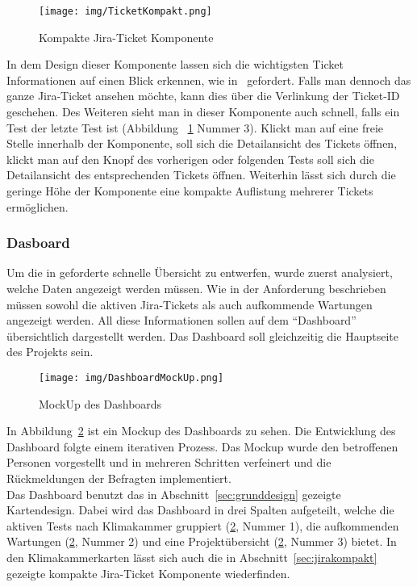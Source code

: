 \begin{figure}[H]
    \texttt{[image: img/TicketKompakt.png]}
    \caption{Kompakte Jira-Ticket Komponente}\label{fig:ticketcompact}
\end{figure}

In dem Design dieser Komponente lassen sich die wichtigsten Ticket Informationen
auf einen Blick erkennen, wie in~ gefordert. 
Falls man dennoch das ganze Jira-Ticket ansehen möchte,
kann dies über die Verlinkung der Ticket-ID geschehen. Des Weiteren sieht man in 
dieser Komponente auch schnell, falls ein Test der letzte Test ist (Abbildung
~\ref{fig:ticketcompact} Nummer 3). Klickt man auf eine freie Stelle innerhalb
der Komponente, soll sich die Detailansicht des Tickets öffnen, klickt man auf 
den Knopf des vorherigen oder folgenden Tests soll sich die Detailansicht des 
entsprechenden Tickets öffnen. Weiterhin lässt sich durch die geringe Höhe der 
Komponente eine kompakte Auflistung mehrerer Tickets ermöglichen.

\subsubsection{Dasboard}
Um die in  geforderte schnelle Übersicht zu entwerfen, 
wurde zuerst analysiert, welche Daten angezeigt werden müssen. Wie in der 
Anforderung beschrieben müssen sowohl die aktiven Jira-Tickets als auch 
aufkommende Wartungen angezeigt werden. All diese Informationen sollen auf dem 
``Dashboard'' übersichtlich dargestellt werden. Das Dashboard soll gleichzeitig
die Hauptseite des Projekts sein.

\begin{figure}[H]
    \texttt{[image: img/DashboardMockUp.png]}
    \caption{MockUp des Dashboards}\label{fig:dashboard}
\end{figure}

In Abbildung~\ref{fig:dashboard} ist ein Mockup des Dashboards zu sehen. 
Die Entwicklung des Dashboard folgte einem iterativen Prozess. Das Mockup wurde
den betroffenen Personen vorgestellt und in mehreren Schritten verfeinert und die 
Rückmeldungen der Befragten implementiert.\\

Das Dashboard benutzt das in Abschnitt~\ref{sec:grunddesign} gezeigte Kartendesign.
Dabei wird das Dashboard in drei Spalten aufgeteilt, welche die aktiven Tests nach
Klimakammer gruppiert (\ref{fig:dashboard}, Nummer 1), 
die aufkommenden Wartungen (\ref{fig:dashboard}, Nummer 2) und eine 
Projektübersicht (\ref{fig:dashboard}, Nummer 3) bietet. In den Klimakammerkarten
lässt sich auch die in Abschnitt~\ref{sec:jirakompakt} gezeigte kompakte Jira-Ticket 
Komponente wiederfinden. \\


